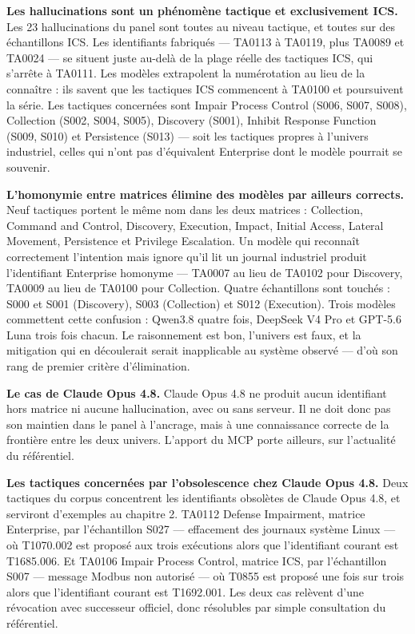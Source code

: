 \textbf{Les hallucinations sont un phénomène tactique et exclusivement ICS.} Les 23 hallucinations du panel sont toutes au niveau tactique, et toutes sur des échantillons ICS. Les identifiants fabriqués --- TA0113 à TA0119, plus TA0089 et TA0024 --- se situent juste au-delà de la plage réelle des tactiques ICS, qui s'arrête à TA0111. Les modèles extrapolent la numérotation au lieu de la connaître : ils savent que les tactiques ICS commencent à TA0100 et poursuivent la série. Les tactiques concernées sont Impair Process Control (S006, S007, S008), Collection (S002, S004, S005), Discovery (S001), Inhibit Response Function (S009, S010) et Persistence (S013) --- soit les tactiques propres à l'univers industriel, celles qui n'ont pas d'équivalent Enterprise dont le modèle pourrait se souvenir.

\textbf{L'homonymie entre matrices élimine des modèles par ailleurs corrects.} Neuf tactiques portent le même nom dans les deux matrices : Collection, Command and Control, Discovery, Execution, Impact, Initial Access, Lateral Movement, Persistence et Privilege Escalation. Un modèle qui reconnaît correctement l'intention mais ignore qu'il lit un journal industriel produit l'identifiant Enterprise homonyme --- TA0007 au lieu de TA0102 pour Discovery, TA0009 au lieu de TA0100 pour Collection. Quatre échantillons sont touchés : S000 et S001 (Discovery), S003 (Collection) et S012 (Execution). Trois modèles commettent cette confusion : Qwen3.8 quatre fois, DeepSeek V4 Pro et GPT-5.6 Luna trois fois chacun. Le raisonnement est bon, l'univers est faux, et la mitigation qui en découlerait serait inapplicable au système observé --- d'où son rang de premier critère d'élimination.

\textbf{Le cas de Claude Opus 4.8.} Claude Opus 4.8 ne produit aucun identifiant hors matrice ni aucune hallucination, avec ou sans serveur. Il ne doit donc pas son maintien dans le panel à l'ancrage, mais à une connaissance correcte de la frontière entre les deux univers. L'apport du MCP porte ailleurs, sur l'actualité du référentiel.

\textbf{Les tactiques concernées par l'obsolescence chez Claude Opus 4.8.} Deux tactiques du corpus concentrent les identifiants obsolètes de Claude Opus 4.8, et serviront d'exemples au chapitre 2. TA0112 Defense Impairment, matrice Enterprise, par l'échantillon S027 --- effacement des journaux système Linux --- où T1070.002 est proposé aux trois exécutions alors que l'identifiant courant est T1685.006. Et TA0106 Impair Process Control, matrice ICS, par l'échantillon S007 --- message Modbus non autorisé --- où T0855 est proposé une fois sur trois alors que l'identifiant courant est T1692.001. Les deux cas relèvent d'une révocation avec successeur officiel, donc résolubles par simple consultation du référentiel.

